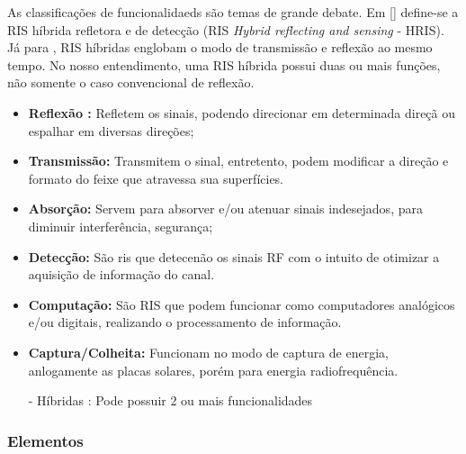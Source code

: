 \documentclass[
	12pt,				%
	openright,			%
	oneside,			%
	a4paper,			%
	english,			%
	brazil				%
	]{abntex2}
\begin{document}
As classificações de funcionalidaeds são temas de grande debate. Em [] define-se a RIS híbrida refletora e de detecção (RIS \textit{Hybrid reflecting and sensing} - HRIS). Já para \cite{CFGOBDRIS}, RIS híbridas englobam o modo de transmissão e reflexão ao mesmo tempo. No nosso entendimento, uma RIS híbrida possui duas ou mais funções, não somente o caso convencional de reflexão. 
\begin{itemize}
   
    \item \textbf{Reflexão :} Refletem os sinais, podendo direcionar em determinada direçã ou espalhar em diversas direções;

    \item \textbf{Transmissão:} Transmitem o sinal, entretento, podem modificar a direção e formato do feixe que atravessa sua superfícies.


    \item  \textbf{Absorção:} Servem para absorver e/ou atenuar sinais indesejados, para diminuir interferência, segurança;

    \item \textbf{Detecção:} São ris que detecenão os sinais RF com o intuito de otimizar a aquisição de informação do canal. 

 \item  \textbf{Computação:} São RIS que podem funcionar como computadores analógicos e/ou digitais, realizando o processamento de informação.

 \item \textbf{Captura/Colheita:} Funcionam no modo de captura de energia, anlogamente as placas solares, porém para energia radiofrequência.

- Híbridas : Pode possuir 2 ou mais funcionalidades
\end{itemize}

\subsubsection{Elementos}   
\end{document}
